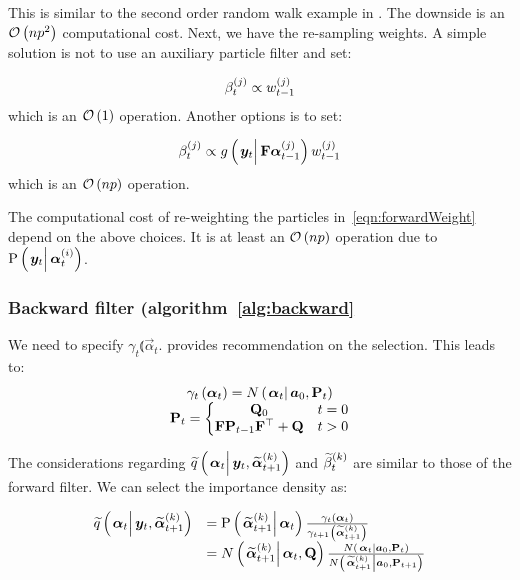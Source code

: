 This is similar to the second order random walk example in \cite{fearnhead10}. The downside is an $\mathcal{O}\left( np^2\right)$ computational cost. Next, we have the re-sampling weights. A simple solution is not to use an auxiliary particle filter and set:

\begin{equation}
	\beta_{t}^{\left( j\right)} \propto w_{t-1}^{\left( j\right)}
\end{equation}
%
which is an $\mathcal{O}\left( 1\right)$ operation. Another options is to set:

\begin{equation}
	\partic{\beta}{t}{j} \propto  \optorC{g}{\vec{y}_t}{\mat{F}\partic{\vec{\alpha}}{t-1}{j}}\partic{w}{t-1}{j}
\end{equation}
%
%
which is an $\mathcal{O}\left( np\right)$ operation.

The computational cost of re-weighting the particles in~\eqref{eqn:forwardWeight} depend on the above choices. It is at least an $\mathcal{O}\left( np\right)$ operation due to $\propC{\vec{y}_t}{\partic{\vec{\alpha}}{t}{i}}$.

\subsubsection*{Backward filter (algorithm~\ref{alg:backward}}
We need to specify $\gamma_t\Lparen{\vec{\alpha}_t}$. \citet[page 69 and 70]{briers10} provides recommendation on the selection. This leads to:
\begin{equation}\begin{matrix}
	\gamma_t\Lparen{\vec{\alpha}_t} =
		\normalC{\vec{\alpha}_t}{\vec{a}_0}{\mat{P}_t} \\
%
	\mat{P}_t = \left\{
		\begin{matrix} \mat{Q}_0 & t = 0 \\ \mat{F}\mat{P}_{t - 1}\mat{F}^\top + \mat{Q} & t > 0   \end{matrix} \right.
\end{matrix}\end{equation}

The considerations regarding $\IDAproxC{\vec{\alpha}_t}{\vec{y}_t, \particB{\vec{\alpha}}{t + 1}{k}}$ and $\widetilde{\beta}_{t}^{\left( k\right)}$ are similar to those of the forward filter. We can select the importance density as:

\begin{equation}\begin{array}{cl}
	\IDAproxC{\vec{\alpha}_t}{\vec{y}_t, \particB{\vec{\alpha}}{t + 1}{k}}  &= %
		\propC{\particB{\vec{\alpha}}{t + 1}{k}}{\vec{\alpha}_t}
		\frac{\gamma_t\Lparen{\vec{\alpha}_t}}{\gamma_{t + 1}\Lparen{\particB{\vec{\alpha}}{t + 1}{k}}} \\
	& = \normalC{\particB{\vec{\alpha}}{t + 1}{k}}{\vec{\alpha}_t}{\mat{Q}}
		\frac{
			\normalC{\vec{\alpha}_t}{\vec{a}_0}{\mat{P}_t}
		}{ %
			\normalC{\particB{\vec{\alpha}}{t + 1}{k}}{\vec{a}_0}{\mat{P}_{t + 1}}
		}
\end{array}\end{equation}

